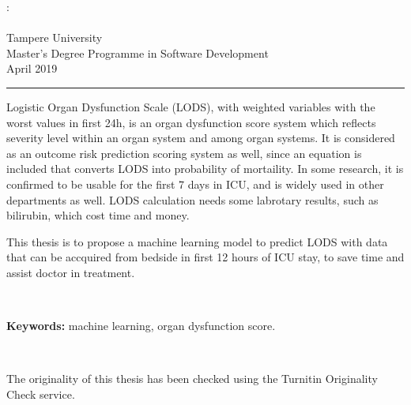\documentclass[12pt,a4paper,english
]{tunithesis}
\begin{document}
\begin{spacing}{1.0}
\noindent \@author: \@title\\
\@thesistype\\
Tampere University\\
Master’s Degree Programme in Software Development\\
April 2019
\end{spacing}
\noindent\rule{12cm}{0.4pt}

\vspace{0.5cm}


\noindent Logistic Organ Dysfunction Scale (LODS), with weighted variables with the worst values in first 24h, is an organ dysfunction score system which reflects severity level within an organ system and among organ systems. It is considered as an outcome risk prediction scoring system as well, since an equation is included that converts LODS into probability of mortaility. In some research, it is confirmed to be usable for the first 7 days in ICU, and is widely used in other departments as well. LODS calculation needs some labrotary results, such as bilirubin, which cost time and money.

\noindent This thesis is to propose a machine learning model to predict LODS with data that can be accquired from bedside in first 12 hours of ICU stay, to save time and assist doctor in treatment.




~

\noindent\textbf{Keywords:} machine learning, organ dysfunction score.

~

\noindent The originality of this thesis has been checked using the Turnitin Originality Check service.




\setcounter{tocdepth}{3}              %
\tableofcontents                      %


\if@twoside
\cleardoublepage
\fi


\renewcommand{\chaptername}{} %
\end{document}
